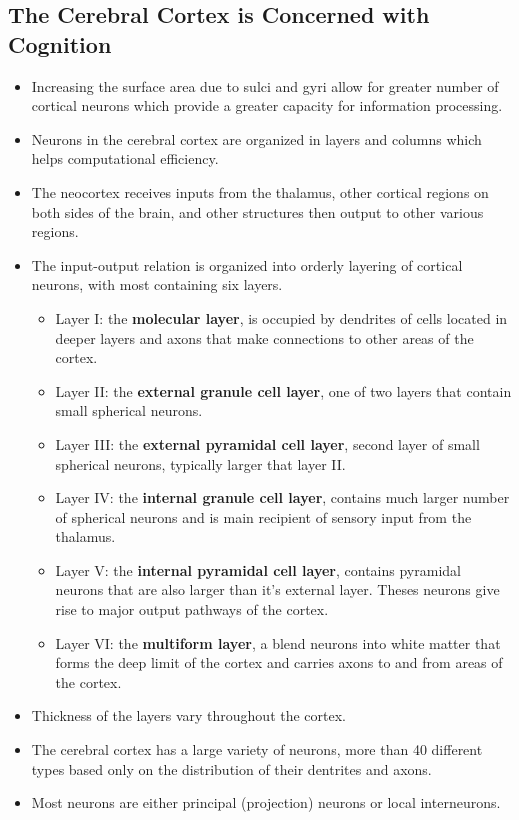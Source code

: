 \documentclass[12pt,a4paper]{article}
\begin{document}
\subsection{The Cerebral Cortex is Concerned with Cognition}
\begin{itemize}
    \item Increasing the surface area due to sulci and gyri allow for greater number of cortical neurons which provide a greater capacity for information processing.
    \item Neurons in the cerebral cortex are organized in layers and columns which helps computational efficiency.
    \item The neocortex receives inputs from the thalamus, other cortical regions on both sides of the brain, and other structures then output to other various regions.
    \item The input-output relation is organized into orderly layering of cortical neurons, with most containing six layers.
        \begin{itemize}
            \item Layer I: the \textbf{molecular layer}, is occupied by dendrites of cells located in deeper layers and axons that make connections to other areas of the cortex.
            \item Layer II: the \textbf{external granule cell layer}, one of two layers that contain small spherical neurons.
            \item Layer III: the \textbf{external pyramidal cell layer}, second layer of small spherical neurons, typically larger that layer II.
            \item Layer IV: the \textbf{internal granule cell layer}, contains much larger number of spherical neurons and is main recipient of sensory input from the thalamus.
            \item Layer V: the \textbf{internal pyramidal cell layer}, contains pyramidal neurons that are also larger than it's external layer. Theses neurons give rise to major output pathways of the cortex.
            \item Layer VI: the \textbf{multiform layer}, a blend neurons into white matter that forms the deep limit of the cortex and carries axons to and from areas of the cortex.
        \end{itemize}
    \item Thickness of the layers vary throughout the cortex.
    \item The cerebral cortex has a large variety of neurons, more than 40 different types based only on the distribution of their dentrites and axons.
    \item Most neurons are either principal (projection) neurons or local interneurons.
\end{itemize}
\end{document}
